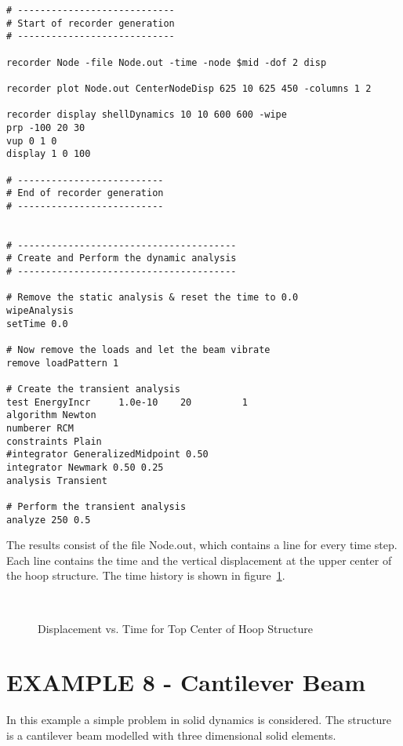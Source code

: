 \documentclass[12pt]{article}
\begin{document}
{\begin{verbatim}
# ----------------------------
# Start of recorder generation
# ----------------------------

recorder Node -file Node.out -time -node $mid -dof 2 disp

recorder plot Node.out CenterNodeDisp 625 10 625 450 -columns 1 2

recorder display shellDynamics 10 10 600 600 -wipe
prp -100 20 30
vup 0 1 0 
display 1 0 100

# --------------------------
# End of recorder generation
# --------------------------


# ---------------------------------------
# Create and Perform the dynamic analysis
# ---------------------------------------

# Remove the static analysis & reset the time to 0.0
wipeAnalysis
setTime 0.0

# Now remove the loads and let the beam vibrate
remove loadPattern 1

# Create the transient analysis
test EnergyIncr     1.0e-10    20         1
algorithm Newton
numberer RCM
constraints Plain 
#integrator GeneralizedMidpoint 0.50
integrator Newmark 0.50 0.25
analysis Transient

# Perform the transient analysis 
analyze 250 0.5

\end{verbatim}
}

\vspace{0.2in} 

The results consist of the file Node.out, which contains a line for
every time step. 
Each line contains the time and the vertical
displacement 
at the upper center of the hoop structure.
The time history is shown in
figure~\ref{shelldisp}. 
\begin{figure}[h]
\begin{center}
\leavevmode
\hbox{%
\epsfxsize=4.0in
\epsfysize=2.8in
}
\end{center}
\caption{Displacement vs. Time for Top Center of Hoop Structure}
\label{shelldisp}
\end{figure}



\clearpage
\section {EXAMPLE 8 - Cantilever Beam}

In this example a simple problem in solid dynamics is considered.
The structure is a cantilever beam modelled with three dimensional
solid elements.
\end{document}
